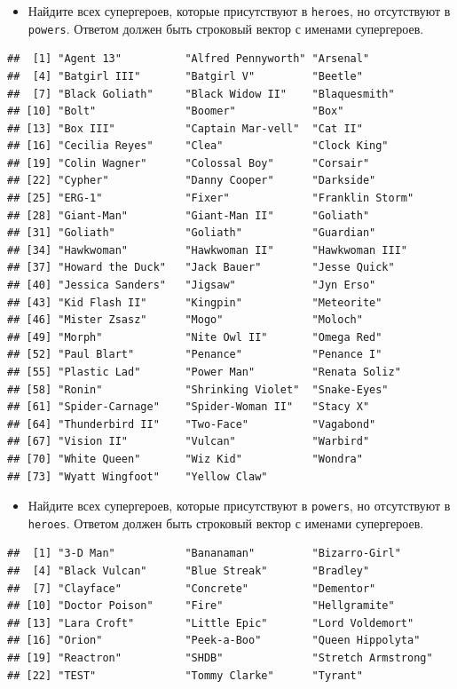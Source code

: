 \documentclass[]{book}
\providecommand{\tightlist}{%
  \setlength{\itemsep}{0pt}\setlength{\parskip}{0pt}}
\begin{document}
\begin{itemize}
\tightlist
\item
  Найдите всех супергероев, которые присутствуют в \texttt{heroes}, но
  отсутствуют в \texttt{powers}. Ответом должен быть строковый вектор с
  именами супергероев.
\end{itemize}

\begin{verbatim}
##  [1] "Agent 13"          "Alfred Pennyworth" "Arsenal"          
##  [4] "Batgirl III"       "Batgirl V"         "Beetle"           
##  [7] "Black Goliath"     "Black Widow II"    "Blaquesmith"      
## [10] "Bolt"              "Boomer"            "Box"              
## [13] "Box III"           "Captain Mar-vell"  "Cat II"           
## [16] "Cecilia Reyes"     "Clea"              "Clock King"       
## [19] "Colin Wagner"      "Colossal Boy"      "Corsair"          
## [22] "Cypher"            "Danny Cooper"      "Darkside"         
## [25] "ERG-1"             "Fixer"             "Franklin Storm"   
## [28] "Giant-Man"         "Giant-Man II"      "Goliath"          
## [31] "Goliath"           "Goliath"           "Guardian"         
## [34] "Hawkwoman"         "Hawkwoman II"      "Hawkwoman III"    
## [37] "Howard the Duck"   "Jack Bauer"        "Jesse Quick"      
## [40] "Jessica Sanders"   "Jigsaw"            "Jyn Erso"         
## [43] "Kid Flash II"      "Kingpin"           "Meteorite"        
## [46] "Mister Zsasz"      "Mogo"              "Moloch"           
## [49] "Morph"             "Nite Owl II"       "Omega Red"        
## [52] "Paul Blart"        "Penance"           "Penance I"        
## [55] "Plastic Lad"       "Power Man"         "Renata Soliz"     
## [58] "Ronin"             "Shrinking Violet"  "Snake-Eyes"       
## [61] "Spider-Carnage"    "Spider-Woman II"   "Stacy X"          
## [64] "Thunderbird II"    "Two-Face"          "Vagabond"         
## [67] "Vision II"         "Vulcan"            "Warbird"          
## [70] "White Queen"       "Wiz Kid"           "Wondra"           
## [73] "Wyatt Wingfoot"    "Yellow Claw"
\end{verbatim}

\begin{itemize}
\tightlist
\item
  Найдите всех супергероев, которые присутствуют в \texttt{powers}, но
  отсутствуют в \texttt{heroes}. Ответом должен быть строковый вектор с
  именами супергероев.
\end{itemize}

\begin{verbatim}
##  [1] "3-D Man"           "Bananaman"         "Bizarro-Girl"     
##  [4] "Black Vulcan"      "Blue Streak"       "Bradley"          
##  [7] "Clayface"          "Concrete"          "Dementor"         
## [10] "Doctor Poison"     "Fire"              "Hellgramite"      
## [13] "Lara Croft"        "Little Epic"       "Lord Voldemort"   
## [16] "Orion"             "Peek-a-Boo"        "Queen Hippolyta"  
## [19] "Reactron"          "SHDB"              "Stretch Armstrong"
## [22] "TEST"              "Tommy Clarke"      "Tyrant"
\end{verbatim}
\end{document}
